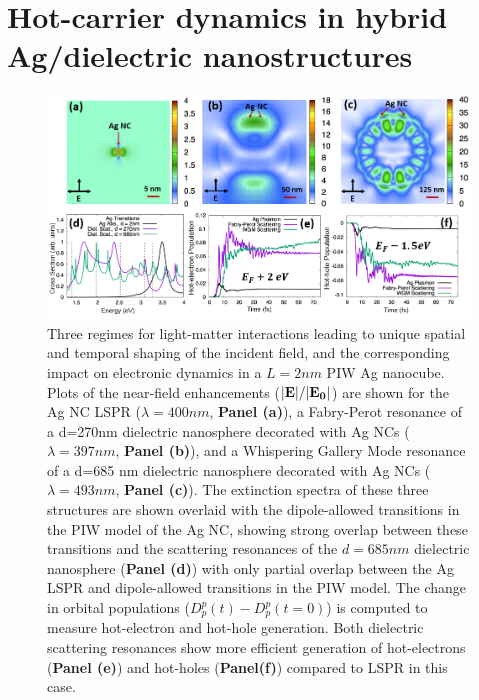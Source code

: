 \documentclass[journal=jpclcd,manuscript=suppinfo]{achemso}
\begin{document}
\section{Hot-carrier dynamics in hybrid Ag/dielectric nanostructures}
\begin{figure}
\begin{center}
\includegraphics[width=6in]{Ag_AllThree_Revision.png}
\caption{Three regimes for light-matter interactions leading to unique
spatial and temporal shaping of the incident field, and the corresponding
impact on electronic dynamics in a $L=2nm$ PIW Ag nanocube. Plots of the near-field enhancements (${\bf |E|}/{\bf |E_0|}$) are shown for the
Ag NC LSPR ($\lambda=400 nm$, {\bf Panel (a)}), a Fabry-Perot resonance of a d=270nm dielectric nanosphere decorated with Ag NCs ($\lambda = 397 nm$, {\bf Panel (b)}),
and a Whispering Gallery Mode resonance of a d=685 nm dielectric nanosphere decorated with Ag NCs ($\lambda = 493 nm$, {\bf Panel (c)}).
The extinction spectra of these three structures are shown overlaid with the dipole-allowed transitions in the PIW model of the Ag NC, showing 
strong overlap between these transitions and the scattering resonances of the $d=685 nm$ dielectric nanosphere ({\bf Panel (d)}) with only
partial overlap between the Ag LSPR and dipole-allowed transitions in the PIW model.
The change in orbital populations ($D_p^p(t)-D_p^p(t=0)$) is computed to measure hot-electron and hot-hole generation.
Both dielectric scattering resonances show more efficient generation of hot-electrons ({\bf Panel (e)}) and hot-holes ({\bf Panel(f)}) compared to LSPR in this case.}
\end{center}
\end{figure}


\newpage
\end{document}
